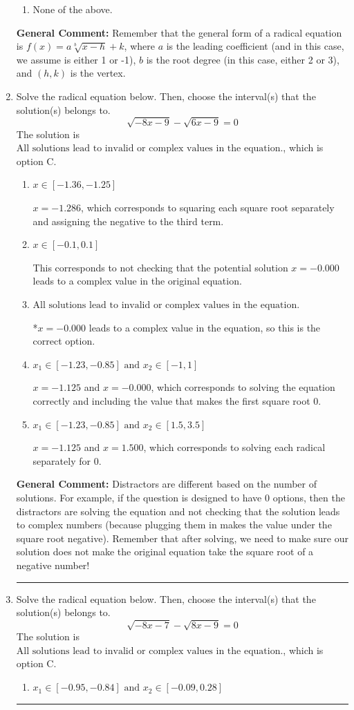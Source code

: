 \documentclass{extbook}[14pt]
\newcommand{\litem}[1]{\item #1

\rule{\textwidth}{0.4pt}}
\begin{document}
\begin{enumerate}
{\begin{enumerate}[label=\Alph*.]
\begin{multicols}{2}
\end{multicols}\item None of the above.\end{enumerate}
\textbf{General Comment:} Remember that the general form of a radical equation is $ f(x) = a \sqrt[b]{x - h} + k $, where $a$ is the leading coefficient (and in this case, we assume is either 1 or -1), $b$ is the root degree (in this case, either 2 or 3), and $(h, k)$ is the vertex.
}
\litem{
Solve the radical equation below. Then, choose the interval(s) that the solution(s) belongs to.
\[ \sqrt{-8 x - 9} - \sqrt{6 x - 9} = 0 \]The solution is \( \text{All solutions lead to invalid or complex values in the equation.} \), which is option C.\begin{enumerate}[label=\Alph*.]
\item \( x \in [-1.36,-1.25] \)

$x = -1.286$, which corresponds to squaring each square root separately and assigning the negative to the third term.
\item \( x \in [-0.1,0.1] \)

This corresponds to not checking that the potential solution $x = -0.000$ leads to a complex value in the original equation.
\item \( \text{All solutions lead to invalid or complex values in the equation.} \)

*$x = -0.000$ leads to a complex value in the equation, so this is the correct option.
\item \( x_1 \in [-1.23, -0.85] \text{ and } x_2 \in [-1,1] \)

$x = -1.125$ and $x = -0.000$, which corresponds to solving the equation correctly and including the value that makes the first square root 0.
\item \( x_1 \in [-1.23, -0.85] \text{ and } x_2 \in [1.5,3.5] \)

$x = -1.125$ and $x = 1.500$, which corresponds to solving each radical separately for 0.
\end{enumerate}

\textbf{General Comment:} Distractors are different based on the number of solutions. For example, if the question is designed to have 0 options, then the distractors are solving the equation and not checking that the solution leads to complex numbers (because plugging them in makes the value under the square root negative). Remember that after solving, we need to make sure our solution does not make the original equation take the square root of a negative number!
}
\litem{
Solve the radical equation below. Then, choose the interval(s) that the solution(s) belongs to.
\[ \sqrt{-8 x - 7} - \sqrt{8 x - 9} = 0 \]The solution is \( \text{All solutions lead to invalid or complex values in the equation.} \), which is option C.\begin{enumerate}[label=\Alph*.]
\item \( x_1 \in [-0.95, -0.84] \text{ and } x_2 \in [-0.09,0.28] \)


\end{enumerate}}
\end{enumerate}
\end{document}

